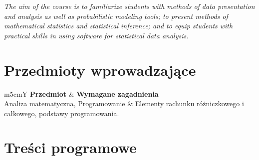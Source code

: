 \documentclass[12pt, a4paper]{article}
\newcommand{\thdrule}{\noalign{\global\setlength{\extrarowheight}{0pt}}}
\newcommand{\thdend}{\noalign{\global\setlength{\extrarowheight}{3pt}}}
\begin{document}
\textit{The aim of the course is to familiarize students with methods of data presentation and analysis as well as probabilistic modeling tools; to present methods of mathematical statistics and statistical inference; and to equip students with practical skills in using software for statistical data analysis.}


\section{Przedmioty wprowadzające}

{\scriptsize
\begin{tabularx}{\textwidth}{m{5cm}Y}
\thdrule\toprule
{} {\color{white}\textbf{Przedmiot}} & {\color{white}\textbf{Wymagane zagadnienia}} \\
\midrule\thdend
   Analiza matematyczna, Programowanie & Elementy rachunku różniczkowego i całkowego, podstawy programowania. \\
\bottomrule
\end{tabularx}}

\section{Treści programowe}
\end{document}
